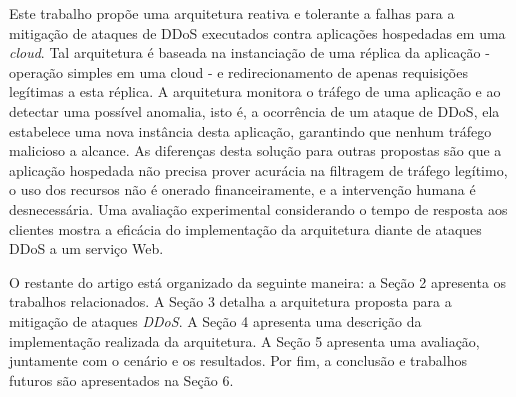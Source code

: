 Este trabalho propõe uma arquitetura reativa e tolerante a falhas para a mitigação de ataques de DDoS executados contra aplicações hospedadas em uma \emph{cloud}. Tal arquitetura é baseada na instanciação de uma réplica da aplicação - operação simples em uma cloud - e redirecionamento de apenas requisições legítimas a esta réplica.  A arquitetura monitora o tráfego de uma aplicação e ao detectar uma possível anomalia, isto é, a ocorrência de um ataque de DDoS, ela estabelece uma nova instância desta aplicação, garantindo que nenhum tráfego malicioso a alcance. 
As diferenças desta solução para outras propostas são que a aplicação hospedada não precisa prover acurácia na filtragem de tráfego legítimo, o uso dos recursos não é onerado financeiramente, e a intervenção humana é desnecessária. 
Uma avaliação experimental considerando o tempo de resposta aos clientes %
mostra a eficácia do implementação da arquitetura diante de ataques DDoS a um serviço Web.
 

O restante do artigo está organizado da seguinte maneira: a Seção 2 apresenta os trabalhos relacionados. A Seção 3 detalha a arquitetura proposta para a mitigação de ataques \emph{DDoS}. A Seção 4 apresenta uma descrição da implementação realizada da arquitetura. A Seção 5 apresenta uma avaliação, juntamente com o cenário e os resultados. Por fim, a conclusão e trabalhos futuros são apresentados na Seção 6.
